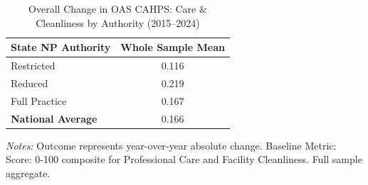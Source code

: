 \begin{table}[htbp]
    \centering
    \caption{Overall Change in OAS CAHPS: Care \& Cleanliness by Authority (2015--2024)}
    \label{tab:d_oas_grp2_full}
    \vspace{0.2cm}
    \begin{tabular}{lc}
        \toprule
        \textbf{State NP Authority} & \textbf{Whole Sample Mean} \\
        \midrule
        Restricted & 0.116 \\
        Reduced & 0.219 \\
        Full Practice & 0.167 \\
        \midrule
        \textbf{National Average} & 0.166 \\
        \bottomrule
    \end{tabular}
    \vspace{0.1cm}
    \begin{minipage}{0.6\textwidth}
        \footnotesize \textit{Notes:} Outcome represents year-over-year absolute change. Baseline Metric: Score: 0-100 composite for Professional Care and Facility Cleanliness. Full sample aggregate.
    \end{minipage}
\end{table}